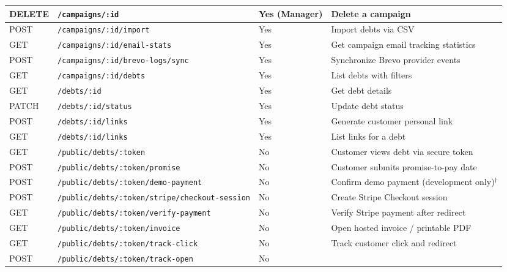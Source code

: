 \documentclass[12pt,a4paper]{report}
\begin{document}
{\begin{longtable}{|p{1.2cm}|p{4.95cm}|p{2.25cm}|p{5.05cm}|}
  \hline
  DELETE& \texttt{/campaigns/:id}                     & Yes (Manager) &
    Delete a campaign \\
  \hline
  POST  & \texttt{/campaigns/:id/import}              & Yes           &
    Import debts via CSV \\
  \hline
  GET   & \texttt{/campaigns/:id/email-stats}         & Yes           &
    Get campaign email tracking statistics \\
  \hline
  POST  & \texttt{/campaigns/:id/brevo-logs/sync}     & Yes           &
    Synchronize Brevo provider events \\
  \hline
  GET   & \texttt{/campaigns/:id/debts}               & Yes           &
    List debts with filters \\
  \hline
  GET   & \texttt{/debts/:id}                         & Yes           &
    Get debt details \\
  \hline
  PATCH & \texttt{/debts/:id/status}                  & Yes           &
    Update debt status \\
  \hline
  POST  & \texttt{/debts/:id/links}                   & Yes           &
    Generate customer personal link \\
  \hline
  GET   & \texttt{/debts/:id/links}                   & Yes           &
    List links for a debt \\
  \hline
  GET   & \texttt{/public/debts/:token}               & No            &
    Customer views debt via secure token \\
  \hline
  POST  & \texttt{/public/debts/:token/promise}       & No            &
    Customer submits promise-to-pay date \\
  \hline
  POST  & \texttt{/public/debts/:token/demo-payment}  & No            &
    Confirm demo payment (development only)$^{\dagger}$ \\
  \hline
  POST  & \texttt{/public/debts/:token/stripe/checkout-session} & No &
    Create Stripe Checkout session \\
  \hline
  GET   & \texttt{/public/debts/:token/verify-payment}& No            &
    Verify Stripe payment after redirect \\
  \hline
  GET   & \texttt{/public/debts/:token/invoice}       & No            &
    Open hosted invoice / printable PDF \\
  \hline
  GET   & \texttt{/public/debts/:token/track-click}   & No            &
    Track customer click and redirect \\
  \hline
  POST  & \texttt{/public/debts/:token/track-open}    & No            &

\end{longtable}}
\end{document}
